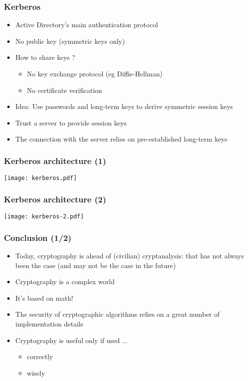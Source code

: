 \documentclass[
hyperref={pdfpagelabels=false}
,xcolor=table
]
{beamer}
\begin{document}
\begin{frame}
  \frametitle{Kerberos}
  \begin{itemize}
  \item Active Directory's main authentication protocol
  \item No public key (symmetric keys only)
  \item How to share keys ?
    \begin{itemize}
    \item No key exchange protocol (eg Diffie-Hellman)
    \item No certificate verification
    \end{itemize}
  \item Idea: Use passwords and long-term keys to derive symmetric session keys
  \item Trust a server to provide session keys
  \item The connection with the server relies on pre-established long-term keys
  \end{itemize}
\end{frame}

\begin{frame}
  \frametitle{Kerberos architecture (1)}
  
  \begin{center}
    \texttt{[image: kerberos.pdf]}
  \end{center}  

\end{frame}


\begin{frame}
  \frametitle{Kerberos architecture (2)}
  
  \begin{center}
    \texttt{[image: kerberos-2.pdf]}
  \end{center}  

\end{frame}


\begin{frame}
  \frametitle{Conclusion (1/2)}
  \begin{block}{}
    \begin{itemize}
    \item Today, cryptography is ahead of (civilian) cryptanalysis: that has not always been the case (and may not be the case in the future)
    \item Cryptography is a complex world
    \item It's based on math!
    \item The security of cryptographic algorithms relies on a great number of implementation details
    \item Cryptography is useful only if used ...
      \begin{itemize}
      \item correctly
      \item wisely
      \end{itemize}
    \end{itemize}	
  \end{block}
\end{frame}
\end{document}
